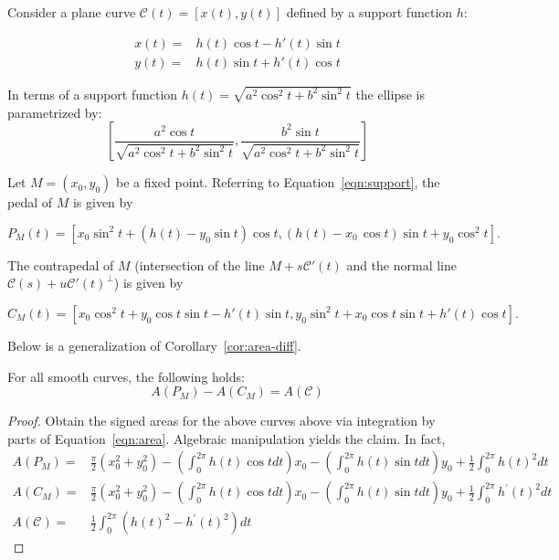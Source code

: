 
 Consider a plane  curve $\mathcal{C}(t)=[x(t),y(t)]$ defined by a support function $h$:

\begin{align}
x(t)=&h(t)\cos t-h'(t)\sin t \label{eqn:support}\\
y(t)=&h(t)\sin t+h'(t)\cos t \nonumber
\end{align}
%

\begin{remark*} In terms of a support function $h(t)=\sqrt{a^2\cos^2{t}  + b^2\sin^2{t}}$
the  ellipse is parametrized by:
\[  \left[ \frac{a^2\cos{t} }{ \sqrt{a^2\cos^2{t}  + b^2\sin^2{t}}}, \frac{b^2\sin{t}}{\sqrt{a^2\cos^2{t}  + b^2\sin^2{t}}} \right]\]
\end{remark*}

Let $M=(x_0,y_0)$ be a fixed point. Referring to Equation~\ref{eqn:support}, the pedal of $M$ is given by

\begin{equation}\label{eq:pedal-suporte}
 P_M(t)= [  x_0 \sin^2 t + \left( h(t) -y_0\sin
 t    \right) \cos t, \left( h(t) -{  x_0}\,\cos t  
   \right) \sin t +   y_0\cos^2 t ].
\end{equation}


The contrapedal of $M$ (intersection of the line $M+s \mathcal{C}'(t)$ and the normal line $\mathcal{C}(s)+u\mathcal{C}'(t)^{\perp}$) is given by

\begin{equation}\label{eq:contrapedal-suporte}
C_M(t)=  [ x_0  \cos^2t   +y_0\cos t
 \sin t -h'(t) \sin t , y_0 \sin^2t
 +x_0\cos t \sin t 
	 + h'(t) \cos t]
.
\end{equation}

Below is a generalization of Corollary~\ref{cor:area-diff}.


\begin{proposition}
For all smooth curves, the following holds:
	\[A(P_M)-A(C_M)=A(\mathcal{C})\]
	\label{prop:darea}

\end{proposition}

\begin{proof}
Obtain the signed areas for the above curves above via integration by parts of  Equation~\ref{eqn:area}. Algebraic manipulation yields the claim.
In fact, 
{\small  
\begin{align}
A(P_M)=& \frac{\pi}{2}(x_0^2+y_0^2)- \left(\int_0^{2\pi}\!\!\!\!\!\!h(t)\cos t dt\right) x_0- \left(\int_0^{2\pi}\!\!\!\!\!\!h(t)\sin t dt \right) y_0+\frac{1}{2}  \int_0^{2\pi}\!\!\!\!\!\!h(t)^2 dt\nonumber \\
A(C_M)=& \frac{\pi}{2}(x_0^2+y_0^2)- \left(\int_0^{2\pi}\!\!\!\!\!\!{h(t)\cos{t}dt}\right) x_0- \left(\int_0^{2\pi}\!\!\!\!\!\!h(t)\sin t dt \right) y_0+\frac{1}{2}\int_0^{2\pi}\!\!\!\!\!\!h^\prime(t)^2 dt \label{eqn:apm-acm}\\
A(\mathcal{C})=& \frac{1}{2}\int_0^{2\pi}\!\!\!\!\!(h(t)^2-h^{\prime}(t)^2)dt\nonumber
%
\end{align}
}
\end{proof}

